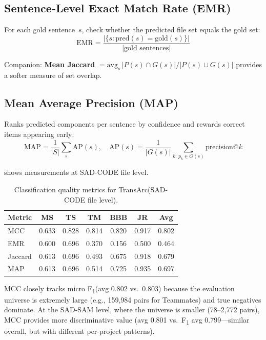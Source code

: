 \documentclass[11pt,a4paper]{report}
\newcommand{\sadcode}{SAD-CODE\xspace}
\newcommand{\sadsam}{SAD-SAM\xspace}
\newcommand{\transarc}{TransArc\xspace}
\newcommand{\fone}{F\textsubscript{1}\xspace}
\begin{document}
\subsection{Sentence-Level Exact Match Rate (EMR)}

For each gold sentence~$s$, check whether the predicted file set equals the
gold set:
\[
\text{EMR} = \frac{|\{s : \text{pred}(s) = \text{gold}(s)\}|}{|\text{gold sentences}|}
\]

Companion: \textbf{Mean Jaccard} $= \text{avg}_{s}\, |P(s) \cap G(s)| / |P(s) \cup G(s)|$
provides a softer measure of set overlap.

\subsection{Mean Average Precision (MAP)}

Ranks predicted components per sentence by confidence and rewards correct items
appearing early:
\[
\text{MAP} = \frac{1}{|S|} \sum_s \text{AP}(s), \quad
\text{AP}(s) = \frac{1}{|G(s)|} \sum_{k:\, p_k \in G(s)} \text{precision@}k
\]

 shows measurements at \sadcode file level.

\begin{table}[h]
\caption{Classification quality metrics for \transarc (\sadcode file level).}
\label{tab:classification}
\centering\small
\begin{tabular}{lcccccc}
\toprule
\textbf{Metric} & \textbf{MS} & \textbf{TS} & \textbf{TM} & \textbf{BBB} & \textbf{JR} & \textbf{Avg} \\
\midrule
MCC      & 0.633 & 0.828 & 0.814 & 0.820 & 0.917 & 0.802 \\
EMR      & 0.600 & 0.696 & 0.370 & 0.156 & 0.500 & 0.464 \\
Jaccard  & 0.613 & 0.696 & 0.493 & 0.675 & 0.918 & 0.679 \\
MAP      & 0.613 & 0.696 & 0.514 & 0.725 & 0.935 & 0.697 \\
\bottomrule
\end{tabular}
\end{table}

MCC closely tracks micro \fone (avg 0.802 vs.\ 0.803) because the evaluation
universe is extremely large (e.g., 159,984 pairs for Teammates) and true
negatives dominate. At the \sadsam level, where the universe is smaller
(78--2,772 pairs), MCC provides more discriminative value (avg 0.801 vs.\
\fone avg 0.799---similar overall, but with different per-project patterns).
\end{document}
